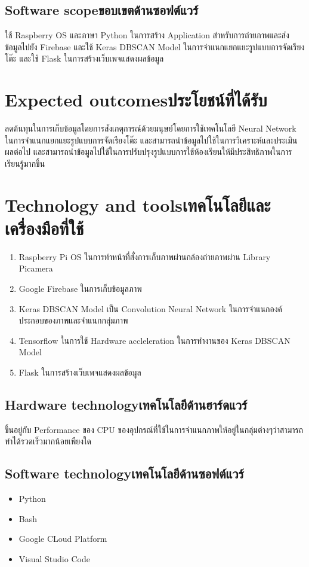 \subsection{\ifenglish Software scope\else ขอบเขตด้านซอฟต์แวร์\fi}
    ใช้ Raspberry OS และภาษา Python ในการสร้าง Application สำหรับการถ่ายภาพและส่งข้อมูลไปยัง Firebase และใช้ Keras DBSCAN Model ในการจำแนกแยกแยะรูปแบบการจัดเรียงโต๊ะ 
    \enskip และใช้ Flask ในการสร้างเว็บเพจแสดงผลข้อมูล
\section{\ifenglish Expected outcomes\else ประโยชน์ที่ได้รับ\fi}
    ลดต้นทุนในการเก็บข้อมูลโดยการสังเกตุการณ์ด้วยมนุษย์โดยการใช้เทคโนโลยี Neural Network ในการจำแนกแยกแยะรูปแบบการจัดเรียงโต๊ะ และสามารถนำข้อมูลไปใช้ในการวิเคราะห์และประเมินผลต่อไป
    \enskip และสามารถนำข้อมูลไปใช้ในการปรับปรุงรูปแบบการใช้ห้องเรียนให้มีประสิทธิภาพในการเรียนรู้มากขึ้น
\section{\ifenglish Technology and tools\else เทคโนโลยีและเครื่องมือที่ใช้\fi}
    \begin{enumerate}
        \item Raspberry Pi OS ในการทำหน้าที่สั่งการเก็บภาพผ่านกล้องถ่ายภาพผ่าน Library Picamera
        \item Google Firebase ในการเก็บข้อมูลภาพ
        \item Keras DBSCAN Model เป็น Convolution Neural Network ในการจำแนกองค์ประกอบของภาพและจำแนกกลุ่มภาพ
        \item Tensorflow ในการใช้ Hardware accleleration ในการทำงานของ Keras DBSCAN Model
        \item Flask ในการสร้างเว็บเพจแสดงผลข้อมูล
    \end{enumerate}
\subsection{\ifenglish Hardware technology\else เทคโนโลยีด้านฮาร์ดแวร์\fi}
    ขึ้นอยู่กับ Performance ของ CPU ของอุปกรณ์ที่ใช้ในการจำแนกภาพให้อยู่ในกลุ่มต่างๆว่าสามารถทำได้รวดเร็วมากน้อยเพียงใด
\subsection{\ifenglish Software technology\else เทคโนโลยีด้านซอฟต์แวร์\fi}
    \begin{itemize}
        \item Python
        \item Bash
        \item Google CLoud Platform
        \item Visual Studio Code
    \end{itemize}
